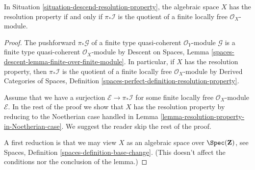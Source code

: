 %
\begin{lemma}
\label{lemma-resolution-property-one-sheaf}
In Situation \ref{situation-descend-resolution-property},
the algebraic space $X$ has the resolution property
if and only if $\pi_*\mathcal{I}$ is the quotient of a
finite locally free $\mathcal{O}_X$-module.
\end{lemma}

\begin{proof}
The pushforward $\pi_*\mathcal{G}$ of a finite type
quasi-coherent $\mathcal{O}_Y$-module $\mathcal{G}$ is a finite
type quasi-coherent $\mathcal{O}_X$-module by
Descent on Spaces, Lemma
\ref{spaces-descent-lemma-finite-over-finite-module}.
In particular, if $X$ has the resolution property, then $\pi_*\mathcal{I}$
is the quotient of a finite locally free $\mathcal{O}_X$-module by
Derived Categories of Spaces, Definition
\ref{spaces-perfect-definition-resolution-property}.

\medskip\noindent
Assume that we have a surjection $\mathcal{E} \to \pi_*\mathcal{I}$
for some finite locally free $\mathcal{O}_X$-module $\mathcal{E}$.
In the rest of the proof we show that $X$ has the resolution property
by reducing to the Noetherian case handled in
Lemma \ref{lemma-resolution-property-in-Noetherian-case}.
We suggest the reader skip the rest of the proof.

\medskip\noindent
A first reduction is that we may view $X$ as an algebraic space over
$\Spec(\mathbf{Z})$, see
Spaces, Definition \ref{spaces-definition-base-change}.
(This doesn't affect the conditions nor the conclusion of the lemma.)


\end{proof}
